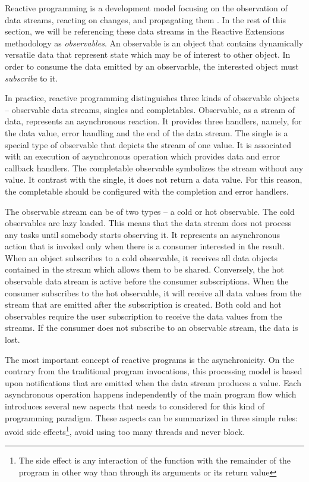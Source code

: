 \documentclass[oneside,
  digital, %
  table,   %
  lof,     %
  lot,     %
]{fithesis3}
\begin{document}
Reactive programming is a development model focusing on the observation of data streams, reacting on changes, and propagating them \cite{building_reactive_ms_in_java}. In the rest of this section, we will be referencing these data streams in the Reactive Extensions methodology as \textit{observables}. An observable is an object that contains dynamically versatile data that represent state which may be of interest to other object. In order to consume the data emitted by an observarble, the interested object must \textit{subscribe} to it.

In practice, reactive programming distinguishes three kinds of observable objects -- observable data streams, singles and completables. Observable, as a stream of data, represents an asynchronous reaction. It provides three handlers, namely, for the data value, error handling and the end of the data stream. The single is a special type of observable that depicts the stream of one value. It is associated with an execution of asynchronous operation which provides data and error callback handlers. The completable observable symbolizes the stream without any value. It contrast with the single, it does not return a data value. For this reason, the completable should be configured with the completion and error handlers.

The observable stream can be of two types -- a cold or hot observable. The cold observables are lazy loaded. This means that the data stream does not process any tasks until somebody starts observing it. It represents an asynchronous action that is invoked only when there is a consumer interested in the result. When an object subscribes to a cold observable, it receives all data objects contained in the stream which allows them to be shared. Conversely, the hot observable data stream is active before the consumer subscriptions. When the consumer subscribes to the hot observable, it will receive all data values from the stream that are emitted after the subscription is created. Both cold and hot observables require the user subscription to receive the data values from the streams. If the consumer does not subscribe to an observable stream, the data is lost.

The most important concept of reactive programs is the asynchronicity. On the contrary from the traditional program invocations, this processing model is based upon notifications that are emitted when the data stream produces a value. Each asynchronous operation happens independently of the main program flow which introduces several new aspects that needs to considered for this kind of programming paradigm. These aspects can be summarized in three simple rules: avoid side effects\footnote{The side effect is any interaction of the function with the remainder of the program in other way than through its arguments or its return value}, avoid using too many threads and never block.
\end{document}
